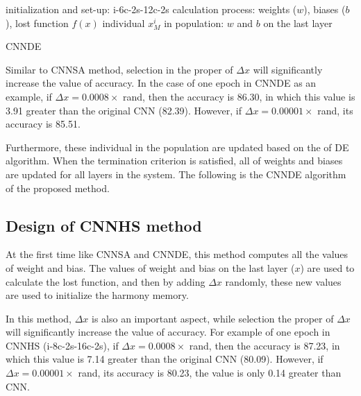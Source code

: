 \documentclass[10pt,letterpaper]{article}
\begin{document}
\vspace{3mm}

\begin{algorithm}[H]
\SetAlgoLined
{}
 initialization and set-up: i-6c-2s-12c-2s \;
 calculation process: weights ($w$), biases ($b$), lost function \(f(x)\)\;
 individual \(x_M^i\) in population: $w$ and $b$ on the last layer\; 
 

\caption{CNNDE}
\end{algorithm}

\vspace{3mm}
Similar to CNNSA method, selection in the proper of $\Delta x$ will significantly increase the value of accuracy. In the case of one epoch in CNNDE as an example, if $\Delta x = 0.0008 \times$ rand, then the accuracy is 86.30, in which this value is 3.91 greater than the original CNN (82.39). However, if $\Delta x = 0.00001 \times$ rand, its accuracy is 85.51.

Furthermore, these individual in the population are updated based on the of DE algorithm. When the termination criterion is satisfied, all of weights and biases are updated for all layers in the system. The following is the CNNDE algorithm of the proposed method.


\subsection{Design of CNNHS method}

At the first time like CNNSA and CNNDE, this method computes all the values of weight and bias. The values of weight and bias on the last layer ($x$) are used to calculate the lost function, and then by adding $\Delta x$ randomly, these new values are used to initialize the harmony memory. 

In this method, $\Delta x$ is also an important aspect, while selection the proper of $\Delta x$ will significantly increase the value of accuracy. For example of one epoch in CNNHS (i-8c-2s-16c-2s), if $\Delta x = 0.0008 \times$ rand, then the accuracy is 87.23, in which this value is 7.14 greater than the original CNN (80.09). However, if $\Delta x = 0.00001 \times$ rand, its accuracy is 80.23, the value is only 0.14 greater than CNN.
\end{document}
